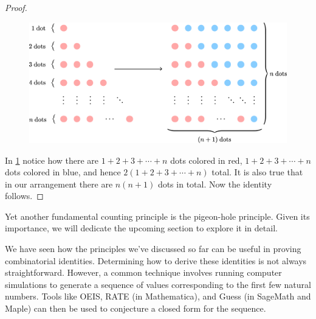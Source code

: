 \begin{proof} 
	\begin{figure}[H]	\includegraphics[scale=0.65]{Images/Figure9.png}
		\caption{}
		\label{f:1.9}
	\end{figure}
In \cref{f:1.9} notice how there are $1+2+3+\cdots+n$ dots colored in red, $1+2+3+\cdots+n$ dots colored in blue, and hence $2\left( 1+2+3+\cdots+n \right)$ total. It is also true that in our arrangement there are $n\left( n+1 \right)$ dots in total. Now the identity follows.
\end{proof}
Yet another fundamental counting principle is the pigeon-hole principle. Given its importance, we will dedicate the upcoming section to explore it in detail.
\begin{remark}
We have seen how the principles we’ve discussed so far can be useful in proving combinatorial identities. Determining how to derive these identities is not always straightforward. However, a common technique involves running computer simulations to generate a sequence of values corresponding to the first few natural numbers. Tools like OEIS, RATE (in Mathematica), and Guess (in SageMath and Maple) can then be used to conjecture a closed form for the sequence.
\end{remark}


